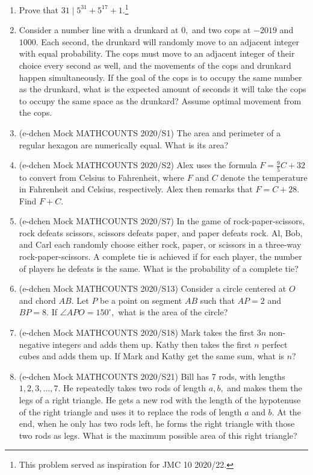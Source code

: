 \documentclass{article}
\begin{document}
\begin{enumerate}
\item Prove that $31\mid 5^{31}+5^{17}+1.$\footnote{This problem served as inspiration for JMC 10 2020/22.}

\item Consider a number line with a drunkard at $0,$ and two cops at $-2019$ and $1000.$ Each second, the drunkard will randomly move to an adjacent integer with equal probability. The cops must move to an adjacent integer of their choice every second as well, and the movements of the cops and drunkard happen simultaneously. If the goal of the cops is to occupy the same number as the drunkard, what is the expected amount of seconds it will take the cops to occupy the same space as the drunkard? Assume optimal movement from the cops.

\item (e-dchen Mock MATHCOUNTS 2020/S1) The area and perimeter of a regular hexagon are numerically equal. What is its area?

\item (e-dchen Mock MATHCOUNTS 2020/S2) Alex uses the formula $F=\frac{9}{5}C+32$ to convert from Celsius to Fahrenheit, where $F$ and $C$ denote the temperature in Fahrenheit and Celsius, respectively. Alex then remarks that $F=C+28.$ Find $F+C.$

\item (e-dchen Mock MATHCOUNTS 2020/S7) In the game of rock-paper-scissors, rock defeats scissors, scissors defeats paper, and paper defeats rock. Al, Bob, and Carl each randomly choose either rock, paper, or scissors in a three-way rock-paper-scissors. A complete tie is achieved if for each player, the number of players he defeats is the same. What is the probability of a complete tie?

\item (e-dchen Mock MATHCOUNTS 2020/S13) Consider a circle centered at $O$ and chord $AB.$ Let $P$ be a point on segment $AB$ such that $AP=2$ and $BP=8.$ If $\angle APO=150^{\circ},$ what is the area of the circle?

\item (e-dchen Mock MATHCOUNTS 2020/S18) Mark takes the first $3n$ non-negative integers and adds them up. Kathy then takes the first $n$ perfect cubes and adds them up. If Mark and Kathy get the same sum, what is $n?$

\item (e-dchen Mock MATHCOUNTS 2020/S21) Bill has 7 rods, with lengths $1,2,3,\dots,7.$ He repeatedly takes two rods of length $a,b,$ and makes them the legs of a right triangle. He gets a new rod with the length of the hypotenuse of the right triangle and uses it to replace the rods of length $a$ and $b.$ At the end, when he only has two rods left, he forms the right triangle with those two rods as legs. What is the maximum possible area of this right triangle?


\end{enumerate}
\end{document}
